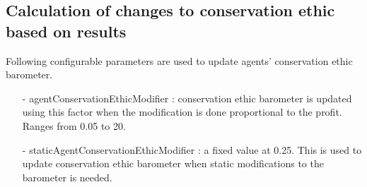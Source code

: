 \documentclass{article} %
\begin{document}
\subsection{Calculation of changes to conservation ethic based on results}
Following configurable parameters are used to update agents' conservation 
ethic barometer.
\begin{itemize}
\item[-] agentConservationEthicModifier : conservation ethic barometer is 
updated using this factor when the modification is done proportional to 
the profit. Ranges from 0.05 to 20.
\item[-] staticAgentConservationEthicModifier : a fixed value at 0.25. 
This is used to update conservation ethic barometer when static modifications 
to the barometer is needed.
\end{itemize}
\end{document}
